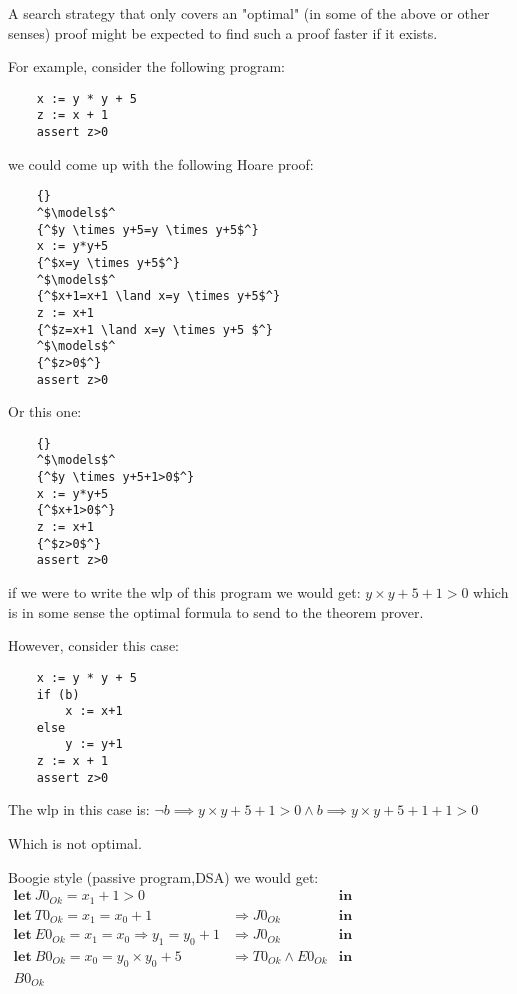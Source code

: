 A search strategy that only covers an "optimal" (in some of the above or other senses) proof might be expected to find such a proof faster if it exists.

For example, consider the following program:
\begin{lstlisting}
	x := y * y + 5
	z := x + 1
	assert z>0
\end{lstlisting}		

we could come up with the following Hoare proof:
\begin{lstlisting}
	{}
	^$\models$^
	{^$y \times y+5=y \times y+5$^}
	x := y*y+5
	{^$x=y \times y+5$^}
	^$\models$^
	{^$x+1=x+1 \land x=y \times y+5$^}
	z := x+1
	{^$z=x+1 \land x=y \times y+5 $^}
	^$\models$^
	{^$z>0$^}
	assert z>0
\end{lstlisting}		

Or this one:
\begin{lstlisting}
	{}
	^$\models$^
	{^$y \times y+5+1>0$^}
	x := y*y+5
	{^$x+1>0$^}
	z := x+1
	{^$z>0$^}
	assert z>0
\end{lstlisting}		

if we were to write the wlp of this program we would get:
$y \times y + 5 + 1>0$ which is in some sense the optimal formula to send to the theorem prover.

However, consider this case:
\begin{lstlisting}
	x := y * y + 5
	if (b)
		x := x+1
	else
		y := y+1
	z := x + 1
	assert z>0
\end{lstlisting}		

The wlp in this case is:
$\lnot b \implies y \times y + 5 + 1>0 \land b \implies y \times y + 5 + 1 + 1>0$

Which is not optimal.

Boogie style (passive program,DSA) we would get: \\
$
\begin{array}{lll}
\mathbf{let}\ J0_{Ok} = x_1+1>0 & &\mathbf{in}\\
\mathbf{let}\ T0_{Ok} = x_1=x_0+1 &\Rightarrow J0_{Ok} & \mathbf{in} \\
\mathbf{let}\ E0_{Ok} = x_1=x_0   \Rightarrow y_1=y_0+1 &\Rightarrow J0_{Ok} &\mathbf{in}\\
\mathbf{let}\ B0_{Ok} = x_0 = y_0 \times y_0 + 5 &\Rightarrow T0_{Ok} \land E0_{Ok} &\mathbf{in}\\
B0_{Ok}
\end{array}
$



